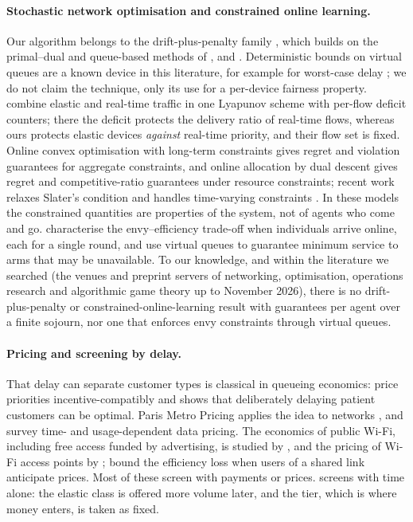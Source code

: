 \paragraph{Stochastic network optimisation and constrained online learning.}
Our algorithm belongs to the drift-plus-penalty family \citep{georgiadis2006resource,neely2010stochastic}, which builds on the primal--dual and queue-based methods of \citet{stolyar2005maximizing}, \citet{eryilmaz2007fair} and \citet{neely2008fairness}.
Deterministic bounds on virtual queues are a known device in this literature, for example for worst-case delay \citep{neely2011worstcase}; we do not claim the technique, only its use for a per-device fairness property.
\citet{jaramillo2011elastic} combine elastic and real-time traffic in one Lyapunov scheme with per-flow deficit counters; there the deficit protects the delivery ratio of real-time flows, whereas ours protects elastic devices \emph{against} real-time priority, and their flow set is fixed.
Online convex optimisation with long-term constraints \citep{mahdavi2012trading,yu2017online,yu2019low} gives regret and violation guarantees for aggregate constraints, and online allocation by dual descent \citep{balseiro2023best,balseiro2025regularized} gives regret and competitive-ratio guarantees under resource constraints; recent work relaxes Slater's condition and handles time-varying constraints \citep{yu2026slater,sarkar2026geometric,abdullah2026dynamic}.
In these models the constrained quantities are properties of the system, not of agents who come and go.
\citet{sinclair2021sequential} characterise the envy--efficiency trade-off when individuals arrive online, each for a single round, and \citet{li2020combinatorial} use virtual queues to guarantee minimum service to arms that may be unavailable.
To our knowledge, and within the literature we searched (the venues and preprint servers of networking, optimisation, operations research and algorithmic game theory up to November 2026), there is no drift-plus-penalty or constrained-online-learning result with guarantees per agent over a finite sojourn, nor one that enforces envy constraints through virtual queues.

\paragraph{Pricing and screening by delay.}
That delay can separate customer types is classical in queueing economics: \citet{mendelson1990optimal} price priorities incentive-compatibly and \citet{afeche2013incentive} shows that deliberately delaying patient customers can be optimal.
Paris Metro Pricing applies the idea to networks \citep{odlyzko1999paris}, and \citet{sen2013survey} survey time- and usage-dependent data pricing.
The economics of public Wi-Fi, including free access funded by advertising, is studied by \citet{yu2017public}, and the pricing of Wi-Fi access points by \citet{musacchio2006wifi}; \citet{johari2004efficiency} bound the efficiency loss when users of a shared link anticipate prices.
Most of these screen with payments or prices.
\repay{} screens with time alone: the elastic class is offered more volume later, and the tier, which is where money enters, is taken as fixed.

